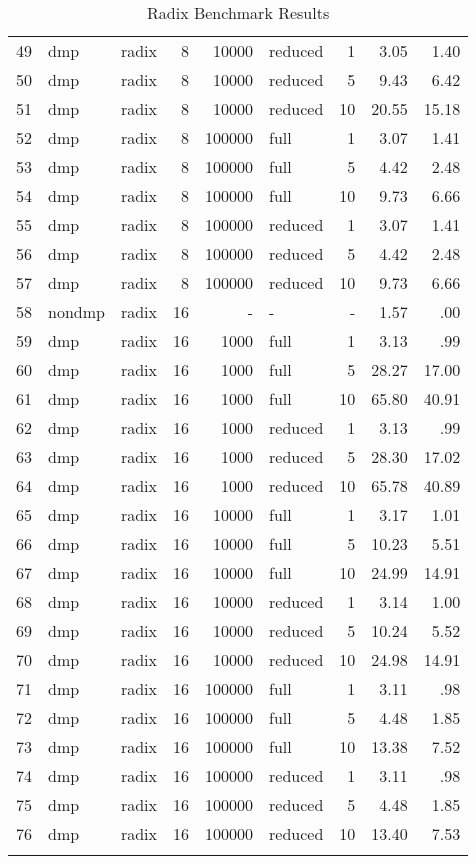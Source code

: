 \begin{center}
\begin{small}
\begin{longtable}{rllrrlrrr}
49 & dmp & radix & 8 & 10000 & reduced & 1 & 3.05 & 1.40\\
50 & dmp & radix & 8 & 10000 & reduced & 5 & 9.43 & 6.42\\
51 & dmp & radix & 8 & 10000 & reduced & 10 & 20.55 & 15.18\\
52 & dmp & radix & 8 & 100000 & full & 1 & 3.07 & 1.41\\
53 & dmp & radix & 8 & 100000 & full & 5 & 4.42 & 2.48\\
54 & dmp & radix & 8 & 100000 & full & 10 & 9.73 & 6.66\\
55 & dmp & radix & 8 & 100000 & reduced & 1 & 3.07 & 1.41\\
56 & dmp & radix & 8 & 100000 & reduced & 5 & 4.42 & 2.48\\
57 & dmp & radix & 8 & 100000 & reduced & 10 & 9.73 & 6.66\\
\hline
58 & nondmp & radix & 16 & - & - & - & 1.57 & .00\\
59 & dmp & radix & 16 & 1000 & full & 1 & 3.13 & .99\\
60 & dmp & radix & 16 & 1000 & full & 5 & 28.27 & 17.00\\
61 & dmp & radix & 16 & 1000 & full & 10 & 65.80 & 40.91\\
62 & dmp & radix & 16 & 1000 & reduced & 1 & 3.13 & .99\\
63 & dmp & radix & 16 & 1000 & reduced & 5 & 28.30 & 17.02\\
64 & dmp & radix & 16 & 1000 & reduced & 10 & 65.78 & 40.89\\
65 & dmp & radix & 16 & 10000 & full & 1 & 3.17 & 1.01\\
66 & dmp & radix & 16 & 10000 & full & 5 & 10.23 & 5.51\\
67 & dmp & radix & 16 & 10000 & full & 10 & 24.99 & 14.91\\
68 & dmp & radix & 16 & 10000 & reduced & 1 & 3.14 & 1.00\\
69 & dmp & radix & 16 & 10000 & reduced & 5 & 10.24 & 5.52\\
70 & dmp & radix & 16 & 10000 & reduced & 10 & 24.98 & 14.91\\
71 & dmp & radix & 16 & 100000 & full & 1 & 3.11 & .98\\
72 & dmp & radix & 16 & 100000 & full & 5 & 4.48 & 1.85\\
73 & dmp & radix & 16 & 100000 & full & 10 & 13.38 & 7.52\\
74 & dmp & radix & 16 & 100000 & reduced & 1 & 3.11 & .98\\
75 & dmp & radix & 16 & 100000 & reduced & 5 & 4.48 & 1.85\\
76 & dmp & radix & 16 & 100000 & reduced & 10 & 13.40 & 7.53\\
\hline
\caption{Radix Benchmark Results}
\label{tab:radix_results}
\end{longtable}
\end{small}
\end{center}


